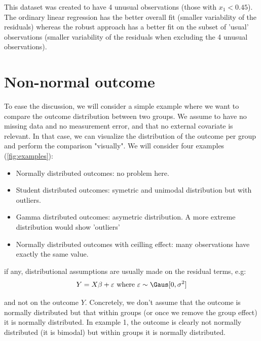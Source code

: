 \documentclass[12pt]{article}
\newcommand\Warning[1][3ex]{%
\renewcommand\stacktype{L}%
\scaleto{\stackon[1.3pt]{\color{red}$\triangle$}{\tiny\bfseries !}}{#1}%
\xspace
}
\begin{document}
\vspace{-1cm}

This dataset was created to have 4 unusual observations (those with
 \(x_1<0.45\)). The ordinary linear regression has the better overall
 fit (smaller variability of the residuals) whereas the robust
 approach has a better fit on the subset of 'usual' observations
 (smaller variability of the residuals when excluding the 4 unusual
 observations).

\clearpage

\section{Non-normal outcome}
\label{sec:outcome}
To ease the discussion, we will consider a simple example where we
want to compare the outcome distribution between two groups. We assume
to have no missing data and no measurement error, and that no external
covariate is relevant. In that case, we can visualize the distribution
of the outcome per group and perform the comparison "visually". We
will consider four examples (\autoref{fig:examples}):
\begin{itemize}
\item Normally distributed outcomes: no problem here.
\item Student distributed outcomes: symetric and unimodal distribution but with outliers.
\item Gamma distributed outcomes: asymetric distribution. A more extreme
distribution would show 'outliers'
\item Normally distributed outcomes with ceilling effect: many
observations have exactly the same value.
\end{itemize}

\Warning if any, distributional assumptions are usually made on the
residual terms, e.g:
\begin{align*}
Y = X \beta + \varepsilon \text{ where } \varepsilon \sim \Gaus[0,\sigma^2]
\end{align*}


and not on the outcome \(Y\). Concretely, we don't assume that the
outcome is normally distributed but that within groups (or once we
remove the group effect) it is normally distributed. In example 1, the
outcome is clearly not normally distributed (it is bimodal) but within
groups it is normally distributed.
\end{document}
